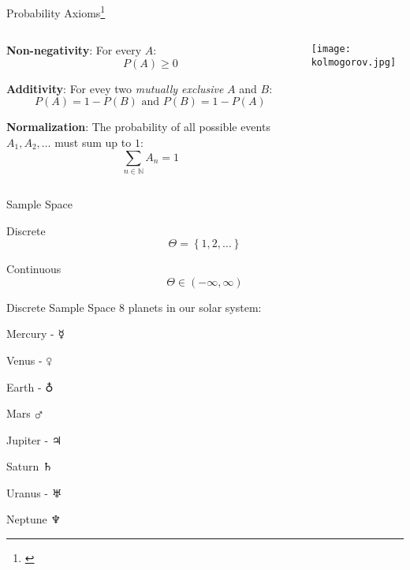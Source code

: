 \begin{frame}{Probability Axioms\footnote{\textcite{kolmogorovFoundationsTheoryProbability1933}}}
	\begin{columns}
		\begin{column}{0.8\textwidth}
			\begin{vfilleditems}
				\item \textbf{Non-negativity}: For every $A$:
				$$P(A) \geq 0$$
				\item \textbf{Additivity}: For evey two \textit{mutually exclusive}
				$A$ and $B$:
				$$P(A) = 1 - P(B) \text{ and } P(B) = 1 - P(A)$$
				\item \textbf{Normalization}: The probability of all possible
				events $A_1, A_2, \dots$ must sum up to $1$:
				$$\sum_{n \in \mathbb{N}} A_n = 1$$
			\end{vfilleditems}
		\end{column}
		\begin{column}{0.2\textwidth}
			\centering
			\texttt{[image: kolmogorov.jpg]}
		\end{column}
	\end{columns}
\end{frame}

\begin{frame}{Sample Space}
	\begin{vfilleditems}
		\item Discrete $$\Theta = \left\{1, 2, \ldots \right\}$$
		\item Continuous $$\Theta \in \left(-\infty, \infty \right)$$
	\end{vfilleditems}
\end{frame}

\begin{frame}{Discrete Sample Space}
	8 planets in our solar system:
	\begin{vfilleditems}
		\item Mercury - $\mercury$
		\item Venus - $\venus$
		\item Earth - $\earth$
		\item Mars $\mars$
		\item Jupiter - $\jupiter$
		\item Saturn $\saturn$
		\item Uranus - $\uranus$
		\item Neptune $\neptune$
	\end{vfilleditems}
\end{frame}

